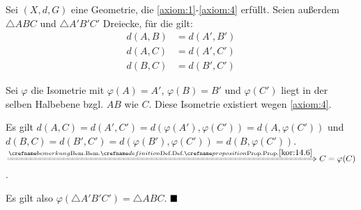 \begin{solution}[\ref{ub-tut-24:a3}]%
    Sei $(X,d,G)$ eine Geometrie, die \ref{axiom:1}-\ref{axiom:4} erfüllt.
    Seien außerdem $\triangle ABC$ und $\triangle A'B' C'$ Dreiecke, für die gilt:
    \begin{align*}
        d(A, B)  &= d(A', B')\\
        d(A, C)  &= d(A', C')\\
        d(B, C)  &= d(B', C')
    \end{align*}

    Sei $\varphi$ die Isometrie mit $\varphi(A) = A'$, $\varphi(B) = B'$ und 
    $\varphi(C')$ liegt in der selben Halbebene bzgl. $AB$ wie $C$. Diese
    Isometrie existiert wegen \ref{axiom:4}.

    Es gilt $d(A,C) = d(A', C') = d(\varphi(A'), \varphi(C')) = d(A, \varphi(C'))$
    und $d(B,C) = d(B', C') = d(\varphi(B'), \varphi(C')) = d(B, \varphi(C'))$.\\
    $\xRightarrow{\crefabbr{kor:14.6}} C = \varphi(C)$.

    Es gilt also $\varphi(\triangle A'B'C') = \triangle ABC$. $\qed$
\end{solution}